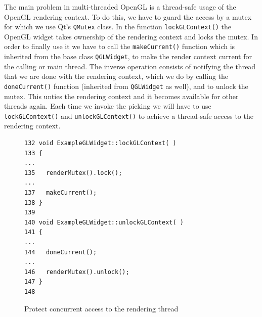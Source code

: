 \documentclass[jou,noapacite]{apa}
\begin{document}
%
%
The main problem in multi-threaded OpenGL is a thread-safe usage of the OpenGL
rendering context.
%
To do this, we have to guard the access by a mutex for which we use
Qt's \lstinline|QMutex| class.
%
In the function \lstinline|lockGLContext()| the OpenGL widget takes ownership of
the rendering context and locks the mutex.
%
In order to finally use it we have to call the \lstinline|makeCurrent()|
function which is inherited from the base class \lstinline|QGLWidget|, to make
the render context current for the calling or main thread.
%
The inverse operation consists of notifying the thread that we are done with
the rendering context, which we do by calling the \lstinline|doneCurrent()|
function (inherited from \lstinline|QGLWidget| as well), and to unlock the
mutex.
%
This unties the rendering context and it becomes available for other threads
again.
%
Each time we invoke the picking we will have to use \lstinline|lockGLContext()|
and \lstinline|unlockGLContext()| to achieve a thread-safe access to the
rendering context.
\begin{figure}[h]
\begin{lstlisting}[basicstyle=\scriptsize]
132 void ExampleGLWidget::lockGLContext( )
133 {
...
135   renderMutex().lock();
...
137   makeCurrent();
138 }
139
140 void ExampleGLWidget::unlockGLContext( )
141 {
...
144   doneCurrent();
...
146   renderMutex().unlock();
147 }
148
\end{lstlisting}
\caption{Protect concurrent access to the rendering thread}
\end{figure}
\end{document}
